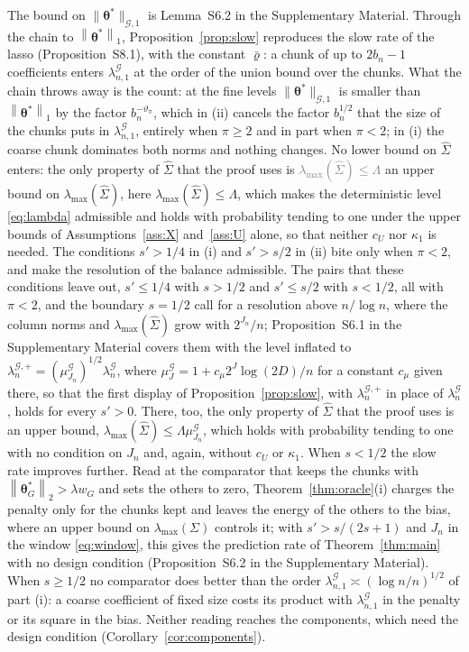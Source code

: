 \documentclass[12pt]{article} %
\theoremstyle{definition}
\theoremstyle{plain}
\newcommand{\norm}[1]{\left\lVert #1 \right\rVert}
\newcommand{\btheta}{\boldsymbol{\theta}}
\newcommand{\thetastar}{\btheta^{*}}
\newcommand{\Gram}{\Sigma}
\newcommand{\Gramhat}{\widehat{\Sigma}}
\newcommand{\pen}{\lambda}
\newcommand{\seff}{s'}
\newcommand{\lmaxx}{\lambda_{\max}}
\newcommand{\Gcal}{\mathcal{G}}
\newcommand{\bn}{b_{n}}
\newcommand{\nGone}[1]{\lVert #1\rVert_{\mathcal{G},1}}
\newcommand{\lamG}{\lambda^{\mathcal{G}}_{n}}
\newcommand{\lamGone}{\lambda^{\mathcal{G}}_{n,1}}
\newcommand{\lamGp}{\lambda^{\mathcal{G},+}_{n}}   %
\begin{document}
\textcolor{colR1}{The bound on $\nGone{\thetastar}$ is Lemma~S6.2 in the
Supplementary Material. Through the chain to $\norm{\thetastar}_{1}$,
Proposition~\ref{prop:slow} reproduces the slow rate of the lasso
(Proposition~S8.1), with the constant $\bar\varrho$: a chunk of up to $2\bn-1$
coefficients enters $\lamGone$ at the order of the union bound over the chunks.
What the chain throws away is the count: at the fine levels
$\nGone{\thetastar}$ is smaller than $\norm{\thetastar}_{1}$ by the factor
$\bn^{-\vartheta_\pi}$, which in (ii) cancels the factor $\bn^{1/2}$ that the
size of the chunks puts in $\lamGone$, entirely when $\pi \ge 2$ and in part
when $\pi < 2$; in (i) the coarse chunk dominates both norms and nothing
changes. No lower bound on $\Gramhat$ enters: the only property of $\Gramhat$
that the proof uses is \textcolor{gray}{\sout{$\lmaxx(\Gramhat) \le \Lambda$}} an upper bound on
$\lmaxx(\Gramhat)$, here $\lmaxx(\Gramhat) \le \Lambda$, which makes the
deterministic level \eqref{eq:lambda} admissible and holds with probability
tending to one under the upper bounds of Assumptions~\ref{ass:X}
and~\ref{ass:U} alone, so that neither $c_U$ nor $\kappa_1$ is needed. The
conditions $\seff > 1/4$ in (i) and $\seff > s/2$ in (ii) bite only when
$\pi < 2$, and make the resolution of the balance admissible.
The pairs that these conditions leave out, $\seff \le 1/4$ with $s > 1/2$ and
$\seff \le s/2$ with $s < 1/2$, all with $\pi < 2$, and the boundary $s = 1/2$
call for a resolution above $n/\log n$, where the column norms and
$\lmaxx(\Gramhat)$ grow with $2^{J_n}/n$; Proposition~S6.1 in the
Supplementary Material covers them with the level inflated to
$\lamGp = (\mu^{\Gcal}_{J_n})^{1/2}\lamG$, where
$\mu^{\Gcal}_{J} = 1 + c_{\mu}2^{J}\log(2D)/n$ for a constant $c_{\mu}$ given
there, so that the first display of Proposition~\ref{prop:slow}, with $\lamGp$
in place of $\lamG$, holds for every $\seff > 0$. There, too, the only
property of $\Gramhat$ that the proof uses is an upper bound,
$\lmaxx(\Gramhat) \le \Lambda\mu^{\Gcal}_{J_n}$, which holds with probability
tending to one with no condition on $J_n$ and, again, without $c_U$ or
$\kappa_1$.
When $s < 1/2$ the slow rate improves further. Read at the comparator that
keeps the chunks with $\norm{\thetastar_{G}}_{2} > \pen w_{G}$ and sets the
others to zero, Theorem~\ref{thm:oracle}(i) charges the penalty only for the
chunks kept and leaves the energy of the others to the bias, where an upper
bound on $\lmaxx(\Gram)$ controls it; with $\seff > s/(2s+1)$ and $J_n$ in the
window \eqref{eq:window}, this gives the prediction rate of
Theorem~\ref{thm:main} with no design condition (Proposition~S6.2 in the
Supplementary Material). When $s \ge 1/2$ no comparator does better than the
order $\lamGone \asymp (\log n/n)^{1/2}$ of part (i): a coarse coefficient of
fixed size costs its product with $\lamGone$ in the penalty or its square in
the bias. Neither reading reaches the components, which need the design
condition (Corollary~\ref{cor:components}).}
\end{document}
